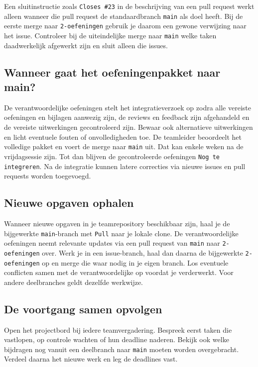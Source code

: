 \documentclass[kulak]{kulakarticle} %
\begin{document}
Een sluitinstructie zoals \texttt{Closes \#23} in de beschrijving van een
pull request werkt alleen wanneer die pull request de standaardbranch
\texttt{main} als doel heeft. Bij de eerste merge naar
\texttt{2-oefeningen} gebruik je daarom een gewone verwijzing naar het
issue. Controleer bij de uiteindelijke merge naar \texttt{main} welke taken
daadwerkelijk afgewerkt zijn en sluit alleen die issues.

\subsection{Wanneer gaat het oefeningenpakket naar main?}

De verantwoordelijke oefeningen stelt het integratieverzoek op zodra alle
vereiste oefeningen en bijlagen aanwezig zijn, de reviews en feedback zijn
afgehandeld en de vereiste uitwerkingen gecontroleerd zijn. Bewaar ook
alternatieve uitwerkingen en licht eventuele fouten of onvolledigheden toe. De
teamleider beoordeelt het volledige pakket en voert de merge naar
\texttt{main} uit. Dat kan enkele weken na de vrijdagsessie zijn.
Tot dan blijven de gecontroleerde oefeningen \texttt{Nog te integreren}.
Na de integratie kunnen latere correcties via nieuwe issues en pull
requests worden toegevoegd.

\subsection{Nieuwe opgaven ophalen}

Wanneer nieuwe opgaven in je teamrepository beschikbaar zijn, haal je de
bijgewerkte \texttt{main}-branch met \texttt{Pull} naar je lokale clone.
De verantwoordelijke oefeningen neemt relevante updates via een pull
request van \texttt{main} naar \texttt{2-oefeningen} over. Werk je in een
issue-branch, haal dan daarna de bijgewerkte \texttt{2-oefeningen} op en
merge die waar nodig in je eigen branch. Los eventuele conflicten samen
met de verantwoordelijke op voordat je verderwerkt. Voor andere
deelbranches geldt dezelfde werkwijze.

\subsection{De voortgang samen opvolgen}

Open het projectbord bij iedere teamvergadering. Bespreek eerst taken die
vastlopen, op controle wachten of hun deadline naderen. Bekijk ook welke
bijdragen nog vanuit een deelbranch naar \texttt{main} moeten worden
overgebracht. Verdeel daarna het nieuwe werk en leg de deadlines vast.
\end{document}
